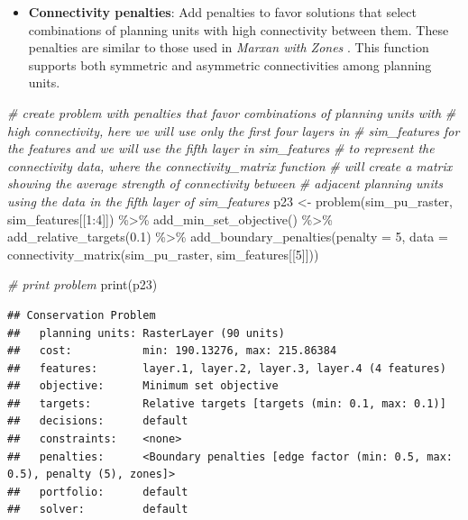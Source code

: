 \documentclass[
  12pt,
]{book}
\newenvironment{Shaded}{\begin{snugshade}}{\end{snugshade}}
\newcommand{\AttributeTok}[1]{\textcolor[rgb]{0.77,0.63,0.00}{#1}}
\newcommand{\CommentTok}[1]{\textcolor[rgb]{0.56,0.35,0.01}{\textit{#1}}}
\newcommand{\DecValTok}[1]{\textcolor[rgb]{0.00,0.00,0.81}{#1}}
\newcommand{\FloatTok}[1]{\textcolor[rgb]{0.00,0.00,0.81}{#1}}
\newcommand{\FunctionTok}[1]{\textcolor[rgb]{0.00,0.00,0.00}{#1}}
\newcommand{\NormalTok}[1]{#1}
\newcommand{\OtherTok}[1]{\textcolor[rgb]{0.56,0.35,0.01}{#1}}
\newcommand{\SpecialCharTok}[1]{\textcolor[rgb]{0.00,0.00,0.00}{#1}}
\providecommand{\tightlist}{%
  \setlength{\itemsep}{0pt}\setlength{\parskip}{0pt}}
\begin{document}
\begin{itemize}
\tightlist
\item
  \textbf{Connectivity penalties}: Add penalties to favor solutions that select combinations of planning units with high connectivity between them. These penalties are similar to those used in \emph{Marxan with Zones} \citep{r2, r1}. This function supports both symmetric and asymmetric connectivities among planning units.
\end{itemize}

\begin{Shaded}
\begin{Highlighting}[]
\CommentTok{\# create problem with penalties that favor combinations of planning units with}
\CommentTok{\# high connectivity, here we will use only the first four layers in}
\CommentTok{\# sim\_features for the features and we will use the fifth layer in sim\_features}
\CommentTok{\# to represent the connectivity data, where the connectivity\_matrix function}
\CommentTok{\# will create a matrix showing the average strength of connectivity between}
\CommentTok{\# adjacent planning units using the data in the fifth layer of sim\_features}
\NormalTok{p23 }\OtherTok{\textless{}{-}} \FunctionTok{problem}\NormalTok{(sim\_pu\_raster, sim\_features[[}\DecValTok{1}\SpecialCharTok{:}\DecValTok{4}\NormalTok{]]) }\SpecialCharTok{\%\textgreater{}\%}
       \FunctionTok{add\_min\_set\_objective}\NormalTok{() }\SpecialCharTok{\%\textgreater{}\%}
       \FunctionTok{add\_relative\_targets}\NormalTok{(}\FloatTok{0.1}\NormalTok{) }\SpecialCharTok{\%\textgreater{}\%}
       \FunctionTok{add\_boundary\_penalties}\NormalTok{(}\AttributeTok{penalty =} \DecValTok{5}\NormalTok{,}
                              \AttributeTok{data =} \FunctionTok{connectivity\_matrix}\NormalTok{(sim\_pu\_raster,}
\NormalTok{                                                         sim\_features[[}\DecValTok{5}\NormalTok{]]))}

\CommentTok{\# print problem}
\FunctionTok{print}\NormalTok{(p23)}
\end{Highlighting}
\end{Shaded}

\begin{verbatim}
## Conservation Problem
##   planning units: RasterLayer (90 units)
##   cost:           min: 190.13276, max: 215.86384
##   features:       layer.1, layer.2, layer.3, layer.4 (4 features)
##   objective:      Minimum set objective 
##   targets:        Relative targets [targets (min: 0.1, max: 0.1)]
##   decisions:      default
##   constraints:    <none>
##   penalties:      <Boundary penalties [edge factor (min: 0.5, max: 0.5), penalty (5), zones]>
##   portfolio:      default
##   solver:         default
\end{verbatim}
\end{document}
